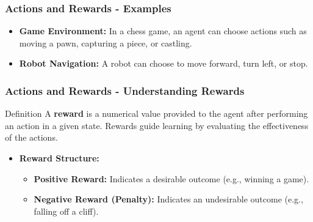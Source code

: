 \documentclass{beamer}
\begin{document}
\begin{frame}[fragile]
    \frametitle{Actions and Rewards - Examples}
    \begin{itemize}
        \item \textbf{Game Environment:} In a chess game, an agent can choose actions such as moving a pawn, capturing a piece, or castling.
        \item \textbf{Robot Navigation:} A robot can choose to move forward, turn left, or stop.
    \end{itemize}
\end{frame}

\begin{frame}[fragile]
    \frametitle{Actions and Rewards - Understanding Rewards}
    \begin{block}{Definition}
        A \textbf{reward} is a numerical value provided to the agent after performing an action in a given state. Rewards guide learning by evaluating the effectiveness of the actions.
    \end{block}
    \begin{itemize}
        \item \textbf{Reward Structure:}
        \begin{itemize}
            \item \textbf{Positive Reward:} Indicates a desirable outcome (e.g., winning a game).
            \item \textbf{Negative Reward (Penalty):} Indicates an undesirable outcome (e.g., falling off a cliff).
        \end{itemize}
    \end{itemize}
\end{frame}
\end{document}

